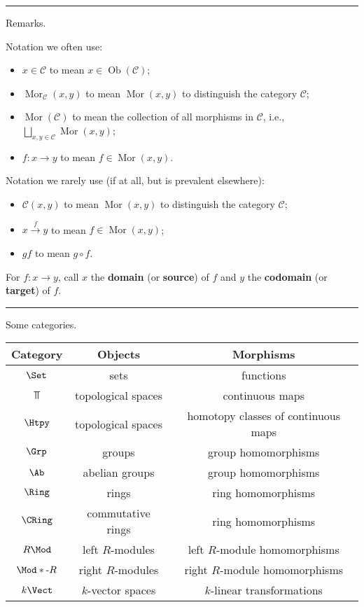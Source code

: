 \documentclass[12pt]{article}
\newcommand{\keyword}[1]{\textbf{#1}}
\newcommand{\sepline}{\rule{\textwidth}{0.4pt}}
\theoremstyle{definition}
\newcommand{\CC}{\mathcal{C}}
\newcommand{\<}{\left\langle}
\renewcommand{\>}{\right\rangle}
\DeclareMathOperator{\Ob}{Ob}
\DeclareMathOperator{\Mor}{Mor}
\begin{document}
\sepline

Remarks.

Notation we often use:
\begin{itemize}
    \item $x \in \CC$ to mean $x \in \Ob(\CC)$;
    \item $\Mor_\CC(x, y)$ to mean $\Mor(x, y)$ to distinguish the category $\CC$;
    \item $\Mor(\CC)$ to mean the collection of all morphisms in $\CC$, i.e., $\bigsqcup_{x, y \in \CC} \Mor(x, y)$;
    \item $f : x \to y$ to mean $f \in \Mor(x, y)$.
\end{itemize}

Notation we rarely use (if at all, but is prevalent elsewhere):
\begin{itemize}
    \item $\CC(x, y)$ to mean $\Mor(x, y)$ to distinguish the category $\CC$;
    \item  $x \xrightarrow{f} y$ to mean $f \in \Mor(x, y)$;
    \item $gf$ to mean $g \circ f$.
\end{itemize}

For $f : x \to y$, call $x$ the \keyword{domain} (or \keyword{source}) of $f$ and $y$ the \keyword{codomain} (or \keyword{target}) of $f$.


\sepline

Some categories.
\begin{center}
    \begin{tabular}{c|c|c}
        Category & Objects & Morphisms \\
        \hline
        $\Set$ & sets & functions \\
        $\Top$ & topological spaces & continuous maps \\
        $\Htpy$ & topological spaces & homotopy classes of continuous maps \\
        $\Grp$ & groups & group homomorphisms \\
        $\Ab$ & abelian groups & group homomorphisms \\
        $\Ring$ & rings & ring homomorphisms \\
        $\CRing$ & commutative rings & ring homomorphisms \\
        $R\Mod$ & left $R$-modules & left $R$-module homomorphisms \\
        $\Mod*\text{-}R$ & right $R$-modules & right $R$-module homomorphisms \\
        $k\Vect$ & $k$-vector spaces & $k$-linear transformations
    \end{tabular}
\end{center}
\end{document}
